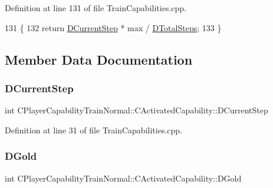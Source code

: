 Definition at line 131 of file Train\+Capabilities.\+cpp.


\begin{DoxyCode}
131                                                                             \{
132     \textcolor{keywordflow}{return} \hyperlink{classCPlayerCapabilityTrainNormal_1_1CActivatedCapability_a2053317e0ee29f45f4ff5a28269cd635}{DCurrentStep} * max / \hyperlink{classCPlayerCapabilityTrainNormal_1_1CActivatedCapability_a2bee6a6395fd7cc0fcf4001bbbadb165}{DTotalSteps};
133 \}
\end{DoxyCode}


\subsection{Member Data Documentation}
\hypertarget{classCPlayerCapabilityTrainNormal_1_1CActivatedCapability_a2053317e0ee29f45f4ff5a28269cd635}{}\label{classCPlayerCapabilityTrainNormal_1_1CActivatedCapability_a2053317e0ee29f45f4ff5a28269cd635} 
\subsubsection{\texorpdfstring{D\+Current\+Step}{DCurrentStep}}
{\footnotesize\ttfamily int C\+Player\+Capability\+Train\+Normal\+::\+C\+Activated\+Capability\+::\+D\+Current\+Step\hspace{0.3cm}{\ttfamily [protected]}}



Definition at line 31 of file Train\+Capabilities.\+cpp.

\hypertarget{classCPlayerCapabilityTrainNormal_1_1CActivatedCapability_a1b994a572ca0fdfd64f6f71afb6b5988}{}\label{classCPlayerCapabilityTrainNormal_1_1CActivatedCapability_a1b994a572ca0fdfd64f6f71afb6b5988} 
\subsubsection{\texorpdfstring{D\+Gold}{DGold}}
{\footnotesize\ttfamily int C\+Player\+Capability\+Train\+Normal\+::\+C\+Activated\+Capability\+::\+D\+Gold\hspace{0.3cm}{\ttfamily [protected]}}



